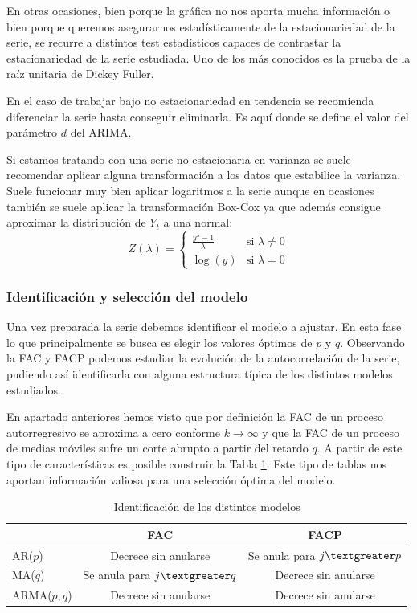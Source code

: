 En otras ocasiones, bien porque la gráfica no nos aporta mucha información o bien porque queremos asegurarnos estadísticamente de la estacionariedad de la serie, se recurre a distintos test estadísticos capaces de contrastar la estacionariedad de la serie estudiada. Uno de los más conocidos es la prueba de la raíz unitaria de Dickey Fuller.

En el caso de trabajar bajo no estacionariedad en tendencia se recomienda diferenciar la serie hasta conseguir eliminarla. Es aquí donde se define el valor del parámetro $d$ del ARIMA.

Si estamos tratando con una serie no estacionaria en varianza se suele recomendar aplicar alguna transformación a los datos que estabilice la varianza. Suele funcionar muy bien aplicar logaritmos a la serie aunque en ocasiones también se suele aplicar la transformación Box-Cox ya que además consigue aproximar la distribución de $Y_t$ a una normal:
\begin{equation}
Z(\lambda) =
\begin{cases}
\frac{y^\lambda - 1}{\lambda} & \text{si } \lambda \neq 0 \\
\log(y) & \text{si } \lambda = 0
\end{cases}
\end{equation}

\subsubsection{Identificación y selección del modelo}
Una vez preparada la serie debemos identificar el modelo a ajustar. En esta fase lo que principalmente se busca es elegir los valores óptimos de $p$ y $q$. Observando la FAC y FACP podemos estudiar la evolución de la autocorrelación de la serie, pudiendo así identificarla con alguna estructura típica de los distintos modelos estudiados.

En apartado anteriores hemos visto que por definición la FAC de un proceso autorregresivo se aproxima a cero conforme $k \rightarrow \infty$ y que la FAC de un proceso de medias móviles sufre un corte abrupto a partir del retardo $q$. A partir de este tipo de características es posible construir la Tabla \ref{identificacion}. Este tipo de tablas nos aportan información valiosa para una selección óptima del modelo.

\begin{table}[]
\centering
\label{my-label}
\begin{tabular}{|l|c|c|}
\hline
\multicolumn{1}{|c|}{} & FAC                            & FACP                           \\ \hline
AR($p$)                  & Decrece sin anularse           & Se anula para $j \textgreater p$ \\ \hline
MA($q$)                  & Se anula para $j \textgreater q$ & Decrece sin anularse           \\ \hline
ARMA($p,q$)              & Decrece sin anularse           & Decrece sin anularse           \\ \hline
\end{tabular}
\caption{Identificación de los distintos modelos}
\label{identificacion}
\end{table}

